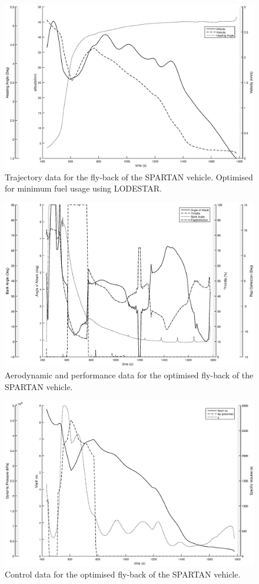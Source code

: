\documentclass[journal]{new-aiaa} %
\begin{document}
\begin{figure}[h]
	\centering
	\includegraphics[width=0.9\linewidth]{Figures/Traj1}
	\caption{Trajectory data for the fly-back of the SPARTAN vehicle. Optimised for minimum fuel usage using LODESTAR. }
	\label{fig:Traj1}
\end{figure}
\begin{figure}[h]
	\centering
	\includegraphics[width=0.9\linewidth]{Figures/Traj2}
	\caption{Aerodynamic and performance data for the optimised fly-back of the SPARTAN vehicle. }
	\label{fig:Traj2}
\end{figure}
\begin{figure}[h]
	\centering
	\includegraphics[width=0.9\linewidth]{Figures/Traj3}
	\caption{Control data for the optimised fly-back of the SPARTAN vehicle.}
	\label{fig:Traj3}
\end{figure}
\end{document}
